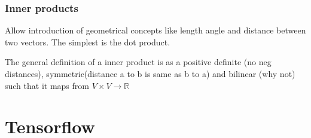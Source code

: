 \documentclass{article}
\begin{document}
\subsubsection{Inner products}
Allow introduction of geometrical concepts like length angle and distance between two vectors.
The simplest is the dot product.

The general definition of a inner product is as a positive definite (no neg distances), symmetric(distance a to b is same as b to a)
and bilinear (why not) such that it maps from $V \times V \rightarrow \mathbb{R} $



\section{Tensorflow}
\end{document}
